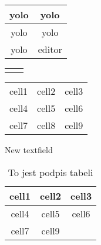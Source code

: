 \documentclass{article}
\begin{document}
\begin{center}
\begin{table}[h!] \begin{center} \begin{tabular}{|c|c|} \hline       yolo&yolo    \\ \hline     yolo&yolo   \\ \hline     yolo&editor   \\ \hline  \end{tabular}\end{center} \end{table}
\begin{table}[h!] \begin{center} \begin{tabular}{|c|c|} \hline  &  \\ \hline  &  \\ \hline  \end{tabular}\end{center} \end{table}
    \begin{tabular}{ c c c }
        cell1 & cell2 & cell3 \\
        cell4 & cell5 & cell6 \\
        cell7 & cell8 & cell9
    \end{tabular}
    New textfield
\end{center}
\begin{table}[h!]
    \begin{center}
        \begin{tabular}{ | c | c | c | }
            \hline
            cell1 & cell2 & cell3 \\ \hline
            cell4 & cell5 & cell6 \\ \hline
            cell7 & cell9 &       \\ \hline
        \end{tabular}
    \end{center}
    \caption{To jest podpis tabeli}
\end{table}
\end{document}
